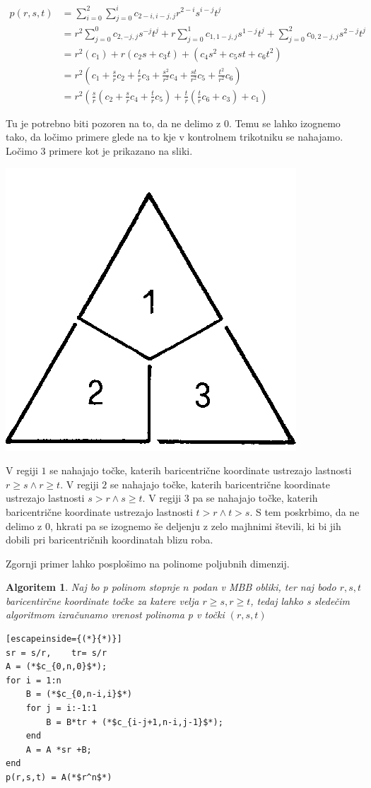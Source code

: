 \documentclass{article}
\newtheorem{algoritm}{Algoritem}[section]
\begin{document}
\begin{align}
p(r,s,t) &= \sum_{i=0}^{2}\sum_{j=0}^{i}c_{2-i,i-j,j}r^{2-i}s^{i-j}t^j \nonumber \\ \nonumber
&= r^2\sum_{j=0}^{0}c_{2,-j,j}s^{-j}t^j + r\sum_{j=0}^{1}c_{1,1-j,j}s^{1-j}t^j + \sum_{j=0}^{2}c_{0,2-j,j}s^{2-j}t^j \\ \nonumber
&= r^2(c_1) + r(c_2s+c_3t) + (c_4s^2+c_5st+c_6t^2)\\ \nonumber
&= r^2(c_1+\frac{s}{r}c_2+\frac{t}{r}c_3+\frac{s^2}{r^2}c_4+\frac{st}{r^2}c_5+\frac{t^2}{r^2}c_6) \\ \nonumber
&= r^2(\frac{s}{r}(c_2+\frac{s}{r}c_4+\frac{t}{r}c_5)+\frac{t}{r}(\frac{t}{r}c_6+c_3)+c_1) \nonumber
\end{align}

Tu je potrebno biti pozoren na to, da ne delimo z $0$. Temu se lahko izognemo tako, da ločimo primere glede na to kje v kontrolnem trikotniku se nahajamo. Ločimo $3$ primere kot je prikazano na sliki.

\begin{center}
\includegraphics[width=.3\linewidth]{graf1.png}
\end{center}

V regiji $1$ se nahajajo točke, katerih baricentrične koordinate ustrezajo lastnosti $r \geq s \wedge r \geq t$. V regiji $2$ se nahajajo točke, katerih baricentrične koordinate ustrezajo lastnosti $s > r \wedge s \geq t$. V regiji $3$ pa se nahajajo točke, katerih baricentrične koordinate ustrezajo lastnosti $t>r \wedge t>s$.
S tem poskrbimo, da ne delimo z $0$, hkrati pa se izognemo še deljenju z zelo majhnimi števili, ki bi jih dobili pri baricentričnih koordinatah blizu roba.

Zgornji primer lahko posplošimo na polinome poljubnih dimenzij.

\begin{algoritm}
Naj bo p polinom stopnje $n$ podan v MBB obliki, ter naj bodo $ r,s,t$ baricentirčne koordinate točke za katere velja $r \geq s,r \geq t$, tedaj lahko s sledečim algoritmom izračunamo vrenost polinoma p v točki $(r,s,t)$
\begin{lstlisting}[escapeinside={(*}{*)}]
sr = s/r,	 tr= s/r
A = (*$c_{0,n,0}$*);
for i = 1:n
    B = (*$c_{0,n-i,i}$*)
    for j = i:-1:1
        B = B*tr + (*$c_{i-j+1,n-i,j-1}$*);
    end
    A = A *sr +B;
end
p(r,s,t) = A(*$r^n$*)
\end{lstlisting}
\end{algoritm}
\end{document}
